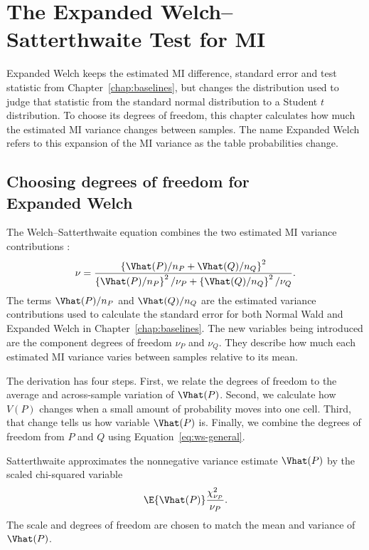 \chapter{The Expanded Welch--Satterthwaite Test for MI}
\label{chap:expanded}

Expanded Welch keeps the estimated MI difference, standard error and test
statistic from Chapter~\ref{chap:baselines}, but changes the distribution used
to judge that statistic from the standard normal distribution to a Student
\(t\) distribution. To choose its degrees of freedom, this chapter calculates
how much the estimated MI variance changes between samples. The name
Expanded Welch refers to this expansion of the MI variance as the table
probabilities change.

\section[Choosing degrees of freedom for Expanded Welch]{Choosing degrees of
freedom for\\Expanded Welch}

The Welch--Satterthwaite equation combines the two estimated MI variance
contributions
\citep{satterthwaite1946,welch1947}:
\begin{equation}
  \nu
  =
  \frac{
  \left\{\Vhat(P)/n_P+\Vhat(Q)/n_Q\right\}^2
  }{
  \left\{\Vhat(P)/n_P\right\}^2/\nu_P
  +\left\{\Vhat(Q)/n_Q\right\}^2/\nu_Q
  }.
  \label{eq:ws-general}
\end{equation}
The terms \(\Vhat(P)/n_P\) and \(\Vhat(Q)/n_Q\) are the estimated variance
contributions used to calculate the standard error for both Normal Wald and
Expanded Welch in Chapter~\ref{chap:baselines}. The new variables being
introduced are the component degrees of freedom \(\nu_P\) and \(\nu_Q\).
They describe how much each
estimated MI variance varies between samples relative to its mean.

The derivation has four steps. First, we relate the degrees of freedom to the
average and across-sample variation of \(\Vhat(P)\). Second, we calculate how \(V(P)\)
changes when a small amount of probability moves into one cell. Third, that
change tells us how variable \(\Vhat(P)\) is. Finally, we combine the
degrees of freedom from \(P\) and \(Q\) using Equation~\eqref{eq:ws-general}.

\medskip
{}

Satterthwaite approximates the nonnegative variance estimate \(\Vhat(P)\) by
the scaled chi-squared variable
\begin{equation}
  \E\{\Vhat(P)\}
  \frac{\chi^2_{\nu_P}}{\nu_P}.
  \label{eq:scaled-chi-working}
\end{equation}
The scale and degrees of freedom are chosen to match the mean and variance
of \(\Vhat(P)\).

